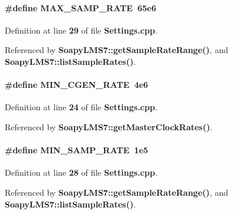 \paragraph[{M\+A\+X\+\_\+\+S\+A\+M\+P\+\_\+\+R\+A\+TE}]{\setlength{\rightskip}{0pt plus 5cm}\#define M\+A\+X\+\_\+\+S\+A\+M\+P\+\_\+\+R\+A\+TE~65e6}\label{Settings_8cpp_ade06b5df8b607335736d024b55e602fa}


Definition at line {\bf 29} of file {\bf Settings.\+cpp}.



Referenced by {\bf Soapy\+L\+M\+S7\+::get\+Sample\+Rate\+Range()}, and {\bf Soapy\+L\+M\+S7\+::list\+Sample\+Rates()}.

\paragraph[{M\+I\+N\+\_\+\+C\+G\+E\+N\+\_\+\+R\+A\+TE}]{\setlength{\rightskip}{0pt plus 5cm}\#define M\+I\+N\+\_\+\+C\+G\+E\+N\+\_\+\+R\+A\+TE~4e6}\label{Settings_8cpp_a1c8883bc901ee54366a08f55de6deff5}


Definition at line {\bf 24} of file {\bf Settings.\+cpp}.



Referenced by {\bf Soapy\+L\+M\+S7\+::get\+Master\+Clock\+Rates()}.

\paragraph[{M\+I\+N\+\_\+\+S\+A\+M\+P\+\_\+\+R\+A\+TE}]{\setlength{\rightskip}{0pt plus 5cm}\#define M\+I\+N\+\_\+\+S\+A\+M\+P\+\_\+\+R\+A\+TE~1e5}\label{Settings_8cpp_ad266967fa51c3e05f3ad5eaf84d7f055}


Definition at line {\bf 28} of file {\bf Settings.\+cpp}.



Referenced by {\bf Soapy\+L\+M\+S7\+::get\+Sample\+Rate\+Range()}, and {\bf Soapy\+L\+M\+S7\+::list\+Sample\+Rates()}.

